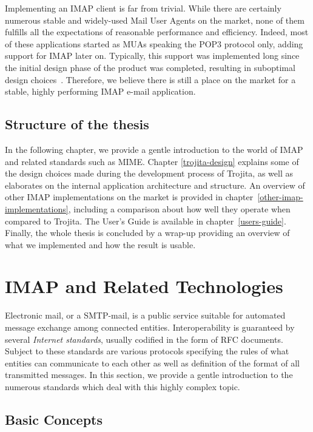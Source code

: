 \documentclass[12pt,notitlepage]{report}
\newcommand{\trojita}{Trojita\xspace}
\begin{document}
Implementing an IMAP client is far from trivial.  While there are certainly
numerous stable and widely-used Mail User Agents on the market, none of them
fulfills all the expectations of reasonable performance and efficiency.  Indeed,
most of these applications started as MUAs speaking the POP3 protocol only,
adding support for IMAP later on.  Typically, this support was implemented long
since the initial design phase of the product was completed, resulting in
suboptimal design choices~\cite{crispin-ten-commandments}.  Therefore, we
believe there is still a place on the market for a stable, highly performing
IMAP e-mail application.

\section{Structure of the thesis}

In the following chapter, we provide a gentle introduction to the world of IMAP
and related standards such as MIME.  Chapter \ref{trojita-design} explains some
of the design choices made during the development process of \trojita, as well as
elaborates on the internal application architecture and structure.  An overview
of other IMAP implementations on the market is provided in
chapter~\ref{other-imap-implementations}, including a comparison about how well
they operate when compared to \trojita.  The User's Guide is
available in chapter~\ref{users-guide}.  Finally, the whole thesis is concluded by a
wrap-up providing an overview of what we implemented and how the result is
usable.

\chapter{IMAP and Related Technologies}

Electronic mail, or a SMTP-mail, is a public service suitable for automated
message exchange among connected entities.  Interoperability is guaranteed by
several {\em Internet standards}, usually codified in the form of RFC documents.
Subject to these standards are various protocols specifying the rules of what
entities can communicate to each other as well as definition of the format of
all transmitted messages. In this section, we provide a gentle introduction to
the numerous standards which deal with this highly complex topic.

\section{Basic Concepts}
\end{document}
